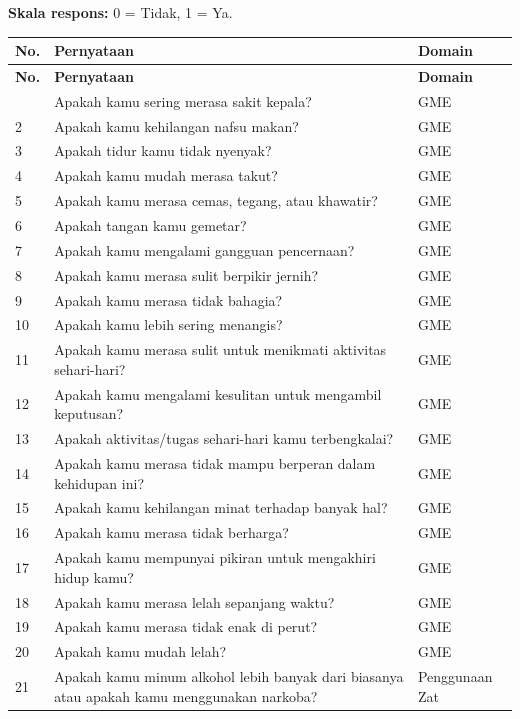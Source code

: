 \noindent\textbf{Skala respons:} 0 = Tidak, 1 = Ya.

{\footnotesize
\renewcommand{\arraystretch}{1.3}
\begin{longtable}{|p{0.7cm}|p{8.9cm}|p{3.0cm}|}
\hline
\textbf{No.} & \textbf{Pernyataan} & \textbf{Domain} \\
\hline
\endfirsthead
\hline
\textbf{No.} & \textbf{Pernyataan} & \textbf{Domain} \\
\hline
\endhead
\hline
\endfoot
1 & Apakah kamu sering merasa sakit kepala? & GME \\
\hline
2 & Apakah kamu kehilangan nafsu makan? & GME \\
\hline
3 & Apakah tidur kamu tidak nyenyak? & GME \\
\hline
4 & Apakah kamu mudah merasa takut? & GME \\
\hline
5 & Apakah kamu merasa cemas, tegang, atau khawatir? & GME \\
\hline
6 & Apakah tangan kamu gemetar? & GME \\
\hline
7 & Apakah kamu mengalami gangguan pencernaan? & GME \\
\hline
8 & Apakah kamu merasa sulit berpikir jernih? & GME \\
\hline
9 & Apakah kamu merasa tidak bahagia? & GME \\
\hline
10 & Apakah kamu lebih sering menangis? & GME \\
\hline
11 & Apakah kamu merasa sulit untuk menikmati aktivitas sehari-hari? & GME \\
\hline
12 & Apakah kamu mengalami kesulitan untuk mengambil keputusan? & GME \\
\hline
13 & Apakah aktivitas/tugas sehari-hari kamu terbengkalai? & GME \\
\hline
14 & Apakah kamu merasa tidak mampu berperan dalam kehidupan ini? & GME \\
\hline
15 & Apakah kamu kehilangan minat terhadap banyak hal? & GME \\
\hline
16 & Apakah kamu merasa tidak berharga? & GME \\
\hline
17 & Apakah kamu mempunyai pikiran untuk mengakhiri hidup kamu? & GME \\
\hline
18 & Apakah kamu merasa lelah sepanjang waktu? & GME \\
\hline
19 & Apakah kamu merasa tidak enak di perut? & GME \\
\hline
20 & Apakah kamu mudah lelah? & GME \\
\hline
21 & Apakah kamu minum alkohol lebih banyak dari biasanya atau apakah kamu menggunakan narkoba? & Penggunaan Zat \\

\end{longtable}}

